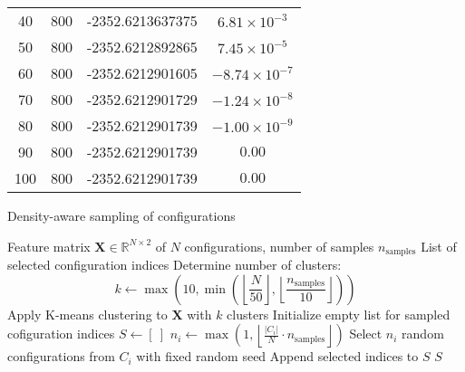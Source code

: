 \begin{table}[htbp]
\begin{tabular}{cccc}
    40 & 800 &  -2352.6213637375 & $6.81 \times 10^{-3}$ \\
    50 & 800 &  -2352.6212892865 & $7.45 \times 10^{-5}$ \\
    60 & 800 &  -2352.6212901605 & $-8.74 \times 10^{-7}$ \\
    70 & 800 &  -2352.6212901729 & $-1.24 \times 10^{-8}$ \\
    80 & 800 &  -2352.6212901739 & $-1.00 \times 10^{-9}$ \\
    90 & 800 &  -2352.6212901739 & $0.00$ \\
    100 & 800 &  -2352.6212901739 & $0.00$ \\
    \bottomrule
    \end{tabular}
\end{table}



\begin{algorithm}[htbp]
    \caption{Density-aware sampling of configurations}
    \label{alg:density_aware_sampling}
    \begin{algorithmic}[1]
    \Require Feature matrix $\mathbf{X} \in \mathbb{R}^{N \times 2}$ of $N$ configurations, number of samples $n_\text{samples}$
    \Ensure List of selected configuration indices
    \State Determine number of clusters:
        \[
        k \gets \max\left(10, \min\left(\left\lfloor \frac{N}{50} \right\rfloor, \left\lfloor \frac{n_\text{samples}}{10} \right\rfloor\right)\right)
        \]
    \State Apply K-means clustering to $\mathbf{X}$ with $k$ clusters
    \State Initialize empty list for sampled cofiguration indices $S \gets [\ ]$
        \State $n_i \gets \max\left(1, \left\lfloor \frac{|C_i|}{N} \cdot n_\text{samples} \right\rfloor \right)$
        \State Select $n_i$ random configurations from $C_i$ with fixed random seed
        \State Append selected indices to $S$
    \EndFor
    \State \Return $S$
    \end{algorithmic}
\end{algorithm}



